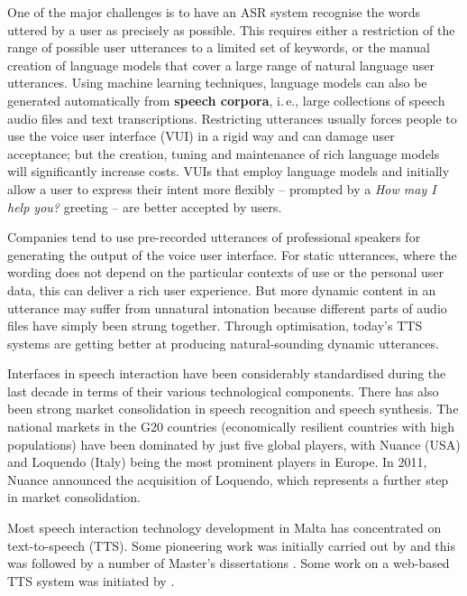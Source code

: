 \begin{multicols}{2}
One of the major challenges is to have an ASR system recognise the words uttered by a user as precisely as possible. This requires either a restriction of the range of possible user utterances to a limited set of keywords, or the manual creation of language models that cover a large range of natural language user utterances. Using machine learning techniques, language models can also be generated automatically from \textbf{speech corpora}, i.\,e., large collections of speech audio files and text transcriptions. Restricting utterances usually forces people to use the voice user interface (VUI) in a rigid way and can damage user acceptance; but the creation, tuning and maintenance of rich language models will significantly increase costs. VUIs that employ language models and initially allow a user to express their intent more flexibly -- prompted by a \textit{How may I help you?} greeting -- are better accepted by users.

Companies tend to use pre-recorded utterances of professional speakers for generating the output of the voice user interface. For static utterances, where the wording does not depend on the particular contexts of use or the personal user data, this can deliver a rich user experience. But more dynamic content in an utterance may suffer from unnatural intonation because different parts of audio files have simply been strung together. Through optimisation, today’s TTS systems are getting better at producing natural-sounding dynamic utterances.


Interfaces in speech interaction have been considerably standardised during the last decade in terms of their various technological components. There has also been strong market consolidation in speech recognition and speech synthesis. The national markets in the G20 countries (economically resilient countries with high populations) have been dominated by just five global players, with Nuance (USA) and Loquendo (Italy) being the most prominent players in Europe. In 2011, Nuance announced the acquisition of Loquendo, which represents a further step in market consolidation.

Most speech interaction technology development in Malta has concentrated on text-to-speech (TTS). Some pioneering work was initially carried out by \cite{Micallef:1997} and this was followed by a number of Master’s dissertations \cite{Farrugia:2005}. Some work on a web-based TTS system was initiated by \cite{Buhagiar-Micallef:2008}.


\end{multicols}
